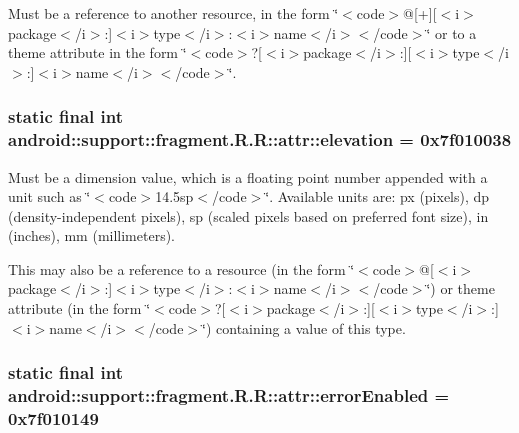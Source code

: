 Must be a reference to another resource, in the form \char`\"{}$<$code$>$@\mbox{[}+\mbox{]}\mbox{[}$<$i$>$package$<$/i$>$:\mbox{]}$<$i$>$type$<$/i$>$:$<$i$>$name$<$/i$>$$<$/code$>$\char`\"{} or to a theme attribute in the form \char`\"{}$<$code$>$?\mbox{[}$<$i$>$package$<$/i$>$:\mbox{]}\mbox{[}$<$i$>$type$<$/i$>$:\mbox{]}$<$i$>$name$<$/i$>$$<$/code$>$\char`\"{}. \hypertarget{classandroid_1_1support_1_1fragment_1_1_r_1_1attr_5e7226eed7d8c1bbb17a64ee35326316}{
\subsubsection[{elevation}]{\setlength{\rightskip}{0pt plus 5cm}static final int android::support::fragment.R.R::attr::elevation = 0x7f010038}}
\label{classandroid_1_1support_1_1fragment_1_1_r_1_1attr_5e7226eed7d8c1bbb17a64ee35326316}


Must be a dimension value, which is a floating point number appended with a unit such as \char`\"{}$<$code$>$14.5sp$<$/code$>$\char`\"{}. Available units are: px (pixels), dp (density-independent pixels), sp (scaled pixels based on preferred font size), in (inches), mm (millimeters). 

This may also be a reference to a resource (in the form \char`\"{}$<$code$>$@\mbox{[}$<$i$>$package$<$/i$>$:\mbox{]}$<$i$>$type$<$/i$>$:$<$i$>$name$<$/i$>$$<$/code$>$\char`\"{}) or theme attribute (in the form \char`\"{}$<$code$>$?\mbox{[}$<$i$>$package$<$/i$>$:\mbox{]}\mbox{[}$<$i$>$type$<$/i$>$:\mbox{]}$<$i$>$name$<$/i$>$$<$/code$>$\char`\"{}) containing a value of this type. \hypertarget{classandroid_1_1support_1_1fragment_1_1_r_1_1attr_d1dee1d93b4d2b9a2ff08bfdf8342b6c}{
\subsubsection[{errorEnabled}]{\setlength{\rightskip}{0pt plus 5cm}static final int android::support::fragment.R.R::attr::errorEnabled = 0x7f010149}}
\label{classandroid_1_1support_1_1fragment_1_1_r_1_1attr_d1dee1d93b4d2b9a2ff08bfdf8342b6c}


